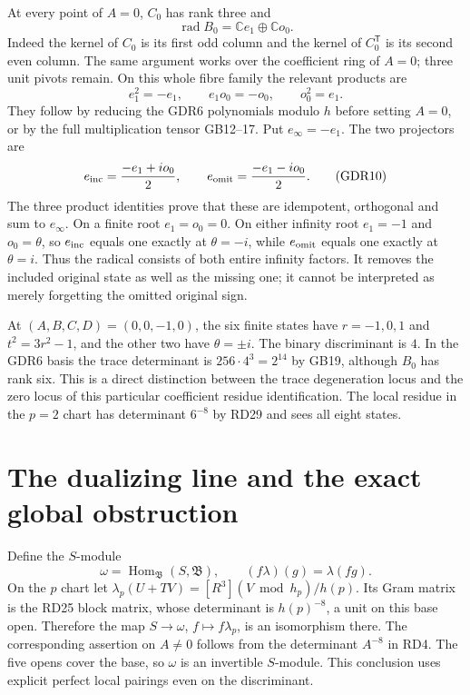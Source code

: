 \documentclass[10pt]{article}
\newcommand{\C}{\mathbb C}
\newcommand{\Hom}{\operatorname{Hom}}
\begin{document}
At every point of $A=0$, $C_0$ has rank three and
\begin{equation}
 \operatorname{rad}B_0=\C e_1\oplus\C o_0.
 \tag{GDR9}
\end{equation}
Indeed the kernel of $C_0$ is its first odd column and the
kernel of $C_0^{\mathsf T}$ is its second even column.
The same argument works over the coefficient ring of $A=0$;
three unit pivots remain. On this whole fibre family the
relevant products are
\[
 e_1^2=-e_1,\qquad e_1o_0=-o_0,\qquad o_0^2=e_1.
\]
They follow by reducing the GDR6 polynomials modulo $h$
before setting $A=0$, or by the full multiplication tensor
GB12--17. Put $e_\infty=-e_1$. The two projectors are
\begin{equation}
 e_{\rm inc}=\frac{-e_1+i o_0}{2},\qquad
 e_{\rm omit}=\frac{-e_1-i o_0}{2}.
 \tag{GDR10}
\end{equation}
The three product identities prove that these are idempotent,
orthogonal and sum to $e_\infty$. On a finite root $e_1=o_0=0$.
On either infinity root $e_1=-1$ and $o_0=\theta$, so
$e_{\rm inc}$ equals one exactly at $\theta=-i$, while
$e_{\rm omit}$ equals one exactly at $\theta=i$.
Thus the radical consists of both entire infinity factors.
It removes the included original state as well as the missing
one; it cannot be interpreted as merely forgetting the omitted
original sign.

At $(A,B,C,D)=(0,0,-1,0)$, the six finite states have
$r=-1,0,1$ and $t^2=3r^2-1$, and the other two have
$\theta=\pm i$. The binary discriminant is $4$.
In the GDR6 basis the trace determinant is
$256\cdot4^3=2^{14}$ by GB19, although $B_0$ has rank six.
This is a direct distinction between the trace degeneration
locus and the zero locus of this particular coefficient
residue identification. The local residue in the $p=2$ chart
has determinant $6^{-8}$ by RD29 and sees all eight states.

\section{The dualizing line and the exact global obstruction}
Define the $S$-module
\begin{equation}
 \omega=\Hom_{\mathfrak B}(S,\mathfrak B),\qquad
 (f\lambda)(g)=\lambda(fg).
 \tag{GDR11}
\end{equation}
On the $p$ chart let
$\lambda_p(U+TV)=[R^3](V\bmod h_p)/h(p)$.
Its Gram matrix is the RD25 block matrix, whose determinant
is $h(p)^{-8}$, a unit on this base open. Therefore the map
$S\to\omega$, $f\mapsto f\lambda_p$, is an isomorphism
there. The corresponding assertion on $A\ne0$ follows from
the determinant $A^{-8}$ in RD4. The five opens cover the
base, so $\omega$ is an invertible $S$-module. This conclusion
uses explicit perfect local pairings even on the discriminant.
\end{document}
